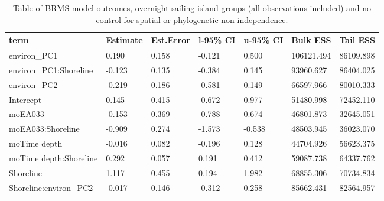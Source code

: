 \begin{table}[ht]
\centering
\begin{tabular}{p{5cm}p{2cm}p{2cm}p{2cm}p{2cm}p{2cm}p{2cm}}
  \toprule
term & Estimate & Est.Error & l-95\% CI & u-95\% CI & Bulk ESS & Tail ESS \\ 
  \midrule
environ\_PC1 & 0.190 & 0.158 & -0.121 & 0.500 & 106121.494 & 86109.898 \\ 
  environ\_PC1:Shoreline & -0.123 & 0.135 & -0.384 & 0.145 & 93960.627 & 86404.025 \\ 
  environ\_PC2 & -0.219 & 0.186 & -0.581 & 0.149 & 66597.966 & 80010.333 \\ 
  Intercept & 0.145 & 0.415 & -0.672 & 0.977 & 51480.998 & 72452.110 \\ 
  moEA033 & -0.153 & 0.369 & -0.788 & 0.674 & 46801.873 & 32645.051 \\ 
  moEA033:Shoreline & -0.909 & 0.274 & -1.573 & -0.538 & 48503.945 & 36023.070 \\ 
  moTime depth & -0.016 & 0.082 & -0.196 & 0.128 & 44704.926 & 56623.375 \\ 
  moTime depth:Shoreline & 0.292 & 0.057 & 0.191 & 0.412 & 59087.738 & 64337.762 \\ 
  Shoreline & 1.117 & 0.455 & 0.194 & 1.982 & 68855.306 & 70734.834 \\ 
  Shoreline:environ\_PC2 & -0.017 & 0.146 & -0.312 & 0.258 & 85662.431 & 82564.957 \\ 
   \bottomrule
\end{tabular}
\caption{Table of BRMS model outcomes, overnight sailing island groups (all observations included) and no control for spatial or phylogenetic non-independence.} 
\label{BRMS_effects_SBZR_control_none}
\end{table}
